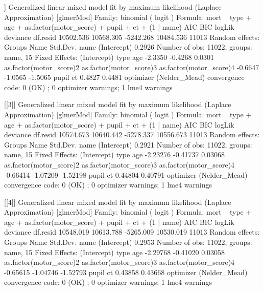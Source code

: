 \documentclass[
]{jss}
\begin{document}
\begin{CodeChunk}
\begin{CodeOutput}
[[2]]
Generalized linear mixed model fit by maximum likelihood (Laplace
  Approximation) [glmerMod]
 Family: binomial  ( logit )
Formula: mort ~ type + age + as.factor(motor_score) + pupil + ct + (1 |  
    name)
      AIC       BIC    logLik  deviance  df.resid 
10502.536 10568.305 -5242.268 10484.536     11013 
Random effects:
 Groups Name        Std.Dev.
 name   (Intercept) 0.2926  
Number of obs: 11022, groups:  name, 15
Fixed Effects:
            (Intercept)                     type                      age  
                -2.3350                  -0.4268                   0.0301  
as.factor(motor_score)2  as.factor(motor_score)3  as.factor(motor_score)4  
                -0.6647                  -1.0565                  -1.5065  
                  pupil                       ct  
                 0.4827                   0.4481  
optimizer (Nelder_Mead) convergence code: 0 (OK) ; 0 optimizer warnings; 1 lme4 warnings 

[[3]]
Generalized linear mixed model fit by maximum likelihood (Laplace
  Approximation) [glmerMod]
 Family: binomial  ( logit )
Formula: mort ~ type + age + as.factor(motor_score) + pupil + ct + (1 |  
    name)
      AIC       BIC    logLik  deviance  df.resid 
10574.673 10640.442 -5278.337 10556.673     11013 
Random effects:
 Groups Name        Std.Dev.
 name   (Intercept) 0.2921  
Number of obs: 11022, groups:  name, 15
Fixed Effects:
            (Intercept)                     type                      age  
               -2.23276                 -0.41737                  0.03068  
as.factor(motor_score)2  as.factor(motor_score)3  as.factor(motor_score)4  
               -0.66414                 -1.07209                 -1.52198  
                  pupil                       ct  
                0.44804                  0.40791  
optimizer (Nelder_Mead) convergence code: 0 (OK) ; 0 optimizer warnings; 1 lme4 warnings 

[[4]]
Generalized linear mixed model fit by maximum likelihood (Laplace
  Approximation) [glmerMod]
 Family: binomial  ( logit )
Formula: mort ~ type + age + as.factor(motor_score) + pupil + ct + (1 |  
    name)
      AIC       BIC    logLik  deviance  df.resid 
10548.019 10613.788 -5265.009 10530.019     11013 
Random effects:
 Groups Name        Std.Dev.
 name   (Intercept) 0.2953  
Number of obs: 11022, groups:  name, 15
Fixed Effects:
            (Intercept)                     type                      age  
               -2.29768                 -0.41020                  0.03058  
as.factor(motor_score)2  as.factor(motor_score)3  as.factor(motor_score)4  
               -0.65615                 -1.04746                 -1.52793  
                  pupil                       ct  
                0.43858                  0.43668  
optimizer (Nelder_Mead) convergence code: 0 (OK) ; 0 optimizer warnings; 1 lme4 warnings 


\end{CodeOutput}
\end{CodeChunk}
\end{document}
